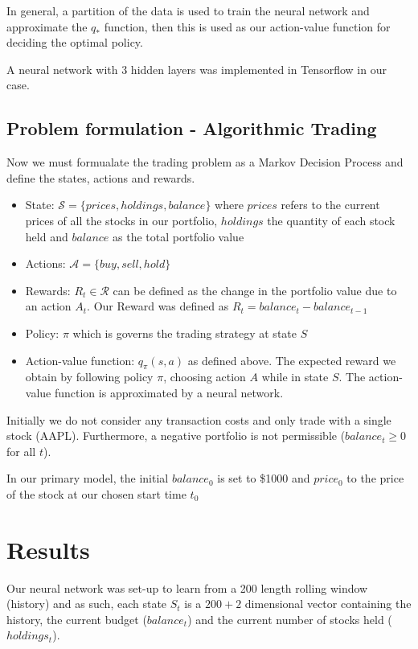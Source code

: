 \documentclass[12pt]{article}
\begin{document}
In general, a partition of the data is used to train the neural network and approximate the $q_{*}$ function, then this is used as our action-value function for deciding the optimal policy.

A neural network with 3 hidden layers was implemented in Tensorflow in our case.


\subsection{Problem formulation - Algorithmic Trading}
Now we must formualate the trading problem as a Markov Decision Process and define the states, actions and rewards.

\begin{itemize}
	\item State: $\mathcal{S} = \{prices,holdings,balance\} $ where $prices$ refers to the current prices of all the stocks in our portfolio, $holdings$ the quantity of each stock held and $balance$ as the total portfolio value
	\item Actions: $\mathcal{A} = \{buy,sell,hold\}$
	\item Rewards: $R_{t} \in \mathcal{R}$ can be defined as the change in the portfolio value due to an action $A_{t}$. Our Reward was defined as $R_{t} = balance_{t} - balance_{t-1}$
	\item Policy: $\pi$ which is governs the trading strategy at state $S$
	\item Action-value function: $q_{\pi}(s,a)$ as defined above. The expected reward we obtain by following policy $\pi$, choosing action $A$ while in state $S$. The action-value function is approximated by a neural network.
\end{itemize}

Initially we do not consider any transaction costs and only trade with a single stock (AAPL). Furthermore, a negative portfolio is not permissible ($balance_{t} \geq 0$ for all $t$).

In our primary model, the initial $balance_{0}$ is set to \$1000 and $price_{0}$ to the price of the stock at our chosen start time $t_{0}$ 




\section{Results}

Our neural network was set-up to learn from a 200 length rolling window (history) and as such, each state $S_{t}$ is a $200+2$ dimensional vector containing the history, the current budget ($balance_{t}$) and the current number of stocks held ($holdings_{t}$).
\end{document}

